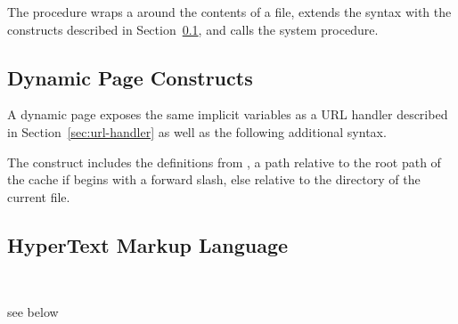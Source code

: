 The  procedure wraps a
 around the contents of a file, extends the
syntax with the constructs described in
Section~\ref{sec:dynamic-page-constructs}, and calls the 
system procedure.

\subsection {Dynamic Page Constructs}\label{sec:dynamic-page-constructs}

A dynamic page exposes the same implicit variables as a URL handler
described in Section~\ref{sec:url-handler} as well as the following
additional syntax.

\begin{syntax}
\end{syntax}\antipar
{}

\begin{syntax}
\end{syntax}\antipar
{}

\begin{syntax}
\end{syntax}\antipar

The  construct includes the definitions from
, a path relative to the root path of the cache if
 begins with a forward slash, else relative to the
directory of the current file.


\subsection {HyperText Markup Language}

\begin{procedure}
   \\
  \strut
\end{procedure}
\returns{} see below

